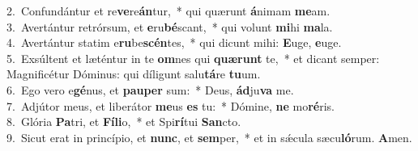 {2.~}Confundántur et re\textbf{ve}re\textbf{án}tur,~* qui quærunt \textbf{á}nimam \textbf{me}am.\\
{3.~}Avertántur retrórsum, et \textbf{e}ru\textbf{bé}scant,~* qui volunt \textbf{mi}hi \textbf{ma}la.\\
{4.~}Avertántur statim e\textbf{ru}be\textbf{scén}tes,~* qui dicunt mihi: \textbf{E}uge, \textbf{e}uge.\\
{5.~}Exsúltent et læténtur in te \textbf{om}nes qui \textbf{quæ}\textbf{runt} te,~* et dicant semper: Magnificétur Dóminus: qui díligunt salu\textbf{tá}re \textbf{tu}um.\\
{6.~}Ego vero e\textbf{gé}nus, et \textbf{pau}\textbf{per} sum:~* Deus, \textbf{ád}ju\textbf{va} me.\\
{7.~}Adjútor meus, et liberátor \textbf{me}us \textbf{es} tu:~* Dómine, \textbf{ne} mo\textbf{ré}ris.\\
{8.~}Glória \textbf{Pa}tri, et \textbf{Fí}\textbf{li}o,~* et Spi\textbf{rí}tui \textbf{San}cto.\\
{9.~}Sicut erat in princípio, et \textbf{nunc}, et \textbf{sem}per,~* et in sǽcula sæcu\textbf{ló}rum. \textbf{A}men.\\
